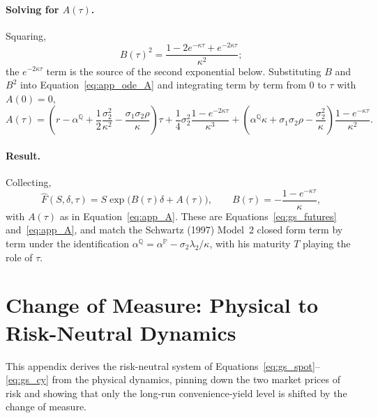 \documentclass[11pt, a4paper]{article}
\newcommand{\convyield}{\delta}             %
\newcommand{\meanrev}{\kappa}               %
\newcommand{\longrun}{\alpha}               %
\begin{document}
\paragraph{Solving for $A(\tau)$.} Squaring,
\begin{equation}
  \label{eq:app_Bsq}
  B(\tau)^2 = \frac{1 - 2e^{-\meanrev\tau} + e^{-2\meanrev\tau}}{\meanrev^2};
\end{equation}
\noindent
the $e^{-2\meanrev\tau}$ term is the source of the second exponential below. Substituting $B$ and $B^2$ into Equation~\ref{eq:app_ode_A} and integrating term by term from $0$ to $\tau$ with $A(0) = 0$,
\begin{equation}
  \label{eq:app_A}
  A(\tau) = \left(r - \longrun^{\mathbb{Q}} + \frac{1}{2}\frac{\sigma_2^2}{\meanrev^2} - \frac{\sigma_1\sigma_2\rho}{\meanrev}\right)\tau
  + \frac{1}{4}\sigma_2^2\frac{1 - e^{-2\meanrev\tau}}{\meanrev^3}
  + \left(\longrun^{\mathbb{Q}}\meanrev + \sigma_1\sigma_2\rho - \frac{\sigma_2^2}{\meanrev}\right)\frac{1 - e^{-\meanrev\tau}}{\meanrev^2}.
\end{equation}

\paragraph{Result.} Collecting,
\begin{equation}
  \label{eq:app_result}
  \hat{F}(S, \convyield, \tau) = S\exp\!\big(B(\tau)\convyield + A(\tau)\big),
  \qquad
  B(\tau) = -\frac{1 - e^{-\meanrev\tau}}{\meanrev},
\end{equation}
\noindent
with $A(\tau)$ as in Equation~\ref{eq:app_A}. These are Equations~\ref{eq:gs_futures} and~\ref{eq:app_A}, and match the Schwartz (1997) Model~2 closed form term by term under the identification $\longrun^{\mathbb{Q}} = \longrun^{\mathbb{P}} - \sigma_2\lambda_2/\meanrev$, with his maturity $T$ playing the role of $\tau$.



\section{Change of Measure: Physical to Risk-Neutral Dynamics}
\label{app:gs_derivation}

This appendix derives the risk-neutral system of Equations~\ref{eq:gs_spot}--\ref{eq:gs_cy} from the physical dynamics, pinning down the two market prices of risk and showing that only the long-run convenience-yield level is shifted by the change of measure.
\end{document}
